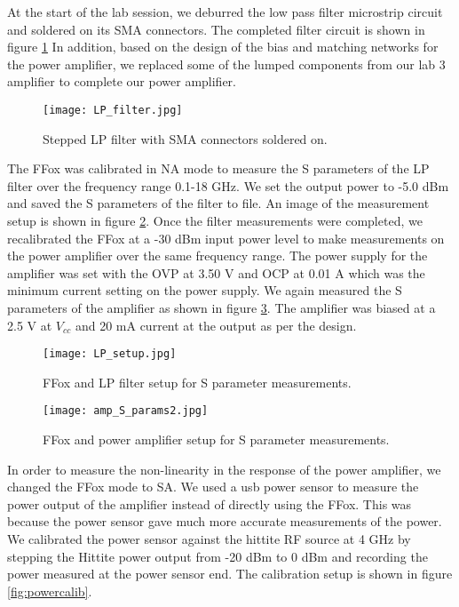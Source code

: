\documentclass{article}
\begin{document}
At the start of the lab session, we deburred the low pass filter microstrip circuit and soldered on its SMA connectors. The completed filter circuit is shown in figure \ref{fig:LPcloseup} In addition, based on the design of the bias and matching networks for the power amplifier, we replaced some of the lumped components from our lab 3 amplifier to complete our power amplifier.

\begin{figure}[!htbp]
    \centering
    \texttt{[image: LP\_filter.jpg]}
    \caption{Stepped LP filter with SMA connectors soldered on.}
    \label{fig:LPcloseup}
\end{figure}

The FFox was calibrated in NA mode to measure the S parameters of the LP filter over the frequency range 0.1-18 GHz. We set the output power to -5.0 dBm and saved the S parameters of the filter to file. An image of the measurement setup is shown in figure \ref{fig:LPsetup}. Once the filter measurements were completed, we recalibrated the FFox at a -30 dBm input power level to make measurements on the power amplifier over the same frequency range. The power supply for the amplifier was set with the OVP at 3.50 V and OCP at 0.01 A which was the minimum current setting on the power supply. We again measured the S parameters of the amplifier as shown in  figure \ref{fig:ampsetup}. The amplifier was biased at a 2.5 V at $V_{cc}$ and 20 mA current at the output as per the design. 

\begin{figure}[!htbp]
    \centering
    \texttt{[image: LP\_setup.jpg]}
    \caption{FFox and LP filter setup for S parameter measurements.}
    \label{fig:LPsetup}
\end{figure}

\begin{figure}[!htbp]
    \centering
    \texttt{[image: amp\_S\_params2.jpg]}
    \caption{FFox and power amplifier setup for S parameter measurements.}
    \label{fig:ampsetup}
\end{figure}

In order to measure the non-linearity in the response of the power amplifier, we changed the FFox mode to SA. We used a usb power sensor to measure the power output of the amplifier instead of directly using the FFox. This was because the power sensor gave much more accurate measurements of the power. We calibrated the power sensor against the hittite RF source at 4 GHz by stepping the Hittite power output from -20 dBm to 0 dBm and recording the power measured at the power sensor end. The calibration setup is shown in figure \ref{fig:powercalib}. 
\end{document}
